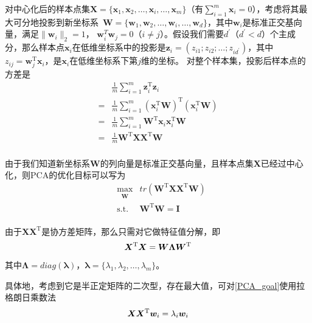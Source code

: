 \documentclass[a4paper,AutoFakeBold,oneside,12pt]{book}
\begin{document}
对中心化后的样本点集$\bm{X}=\{\bm{x}_1,\bm{x}_2,\ldots,\bm{x}_i,\ldots,\bm{x}_m\}$（有$\sum_{i=1}^{m}\bm{x}_i = 0$），考虑将其最大可分地投影到新坐标系\ $\bm{W}= \{\bm{w}_1,\bm{w}_2,\ldots,\bm{w}_i,\ldots,\bm{w}_d\} $，其中$\bm{w}_i$是标准正交基向量，满足$\|\bm{w}_i\|_2 = 1$， $\bm{w}_i^T\bm{w}_j = 0$（$i \not= j$）。假设我们需要$d^\prime$（$d^\prime < d$）个主成分，那么样本点$\bm{x}_i$在低维坐标系中的投影是$\bm{z}_i = (z_{i1};z_{i2};\ldots;z_{id^\prime})$，其中$z_{ij} = \bm{w}_j^\mathrm{T}\bm{x}_i$，是$\bm{x}_i$在低维坐标系下第$j$维的坐标。
对整个样本集，投影后样本点的方差是
\begin{equation}
\begin{aligned}
    & \frac{1}{m}\sum_{i=1}^m \bm{z}_i^\mathrm{T}\bm{z}_i \\
= & \frac{1}{m}\sum_{i=1}^m (\bm{x}_i^\mathrm{T}\bm{W})^\mathrm{T}(\bm{x}_i^\mathrm{T}\bm{W}) \\
= & \frac{1}{m}\sum_{i=1}^m \bm{W}^\mathrm{T}\bm{x}_i\bm{x}_i^\mathrm{T}\bm{W} \\
= & \frac{1}{m} \bm{W}^\mathrm{T}\bm{X}\bm{X}^\mathrm{T}\bm{W} \\
\end{aligned}
\end{equation}

由于我们知道新坐标系$\bm{W}$的列向量是标准正交基向量，且样本点集$\bm{X}$已经过中心化，则PCA的优化目标可以写为
\begin{equation}
\label{PCA_goal}
\begin{aligned}
& \max_{\substack{\bm{W}}}  &  tr(\bm{W}^\mathrm{T}\bm{X}\bm{X}^ \mathrm{T}\bm{W}) \\
& \operatorname{ s.t. }  &  \bm{W}^\mathrm{T}\bm{W} = \bm{I} \\
\end{aligned}
\end{equation}

由于$\bm{X}\bm{X}^ \mathrm{ T }$是协方差矩阵，那么只需对它做特征值分解，即
\begin{equation}
\label{PCA_eigenvalue}
\bm{X}^ \mathrm{ T }\bm{X} = \bm{W}\bm{\Lambda}\bm{W}^ \mathrm{ T } \\
\end{equation}
其中$\bm{\Lambda}=diag(\bm{\lambda})$，$\bm{\lambda} = \{\lambda_1,\lambda_2,\ldots,\lambda_m\}$。

具体地，考虑到它是半正定矩阵的二次型，存在最大值，可对\eqref{PCA_goal}使用拉格朗日乘数法
\begin{equation}
\bm{X}\bm{X}^ \mathrm{ T }\bm{w}_i  = \lambda_i \bm{w}_i \\
\end{equation}
\end{document}
